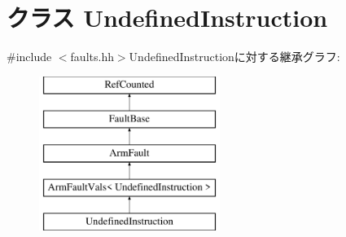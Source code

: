 \hypertarget{classArmISA_1_1UndefinedInstruction}{
\section{クラス UndefinedInstruction}
\label{classArmISA_1_1UndefinedInstruction}
}


{\ttfamily \#include $<$faults.hh$>$}UndefinedInstructionに対する継承グラフ:\begin{figure}[H]
\begin{center}
\leavevmode
\includegraphics[height=5cm]{classArmISA_1_1UndefinedInstruction}
\end{center}
\end{figure}
